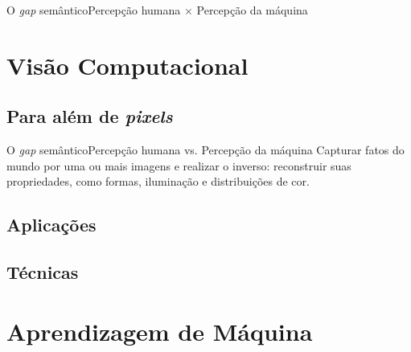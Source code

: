 \documentclass{beamer}
\begin{document}
    \begin{frame}{O \emph{gap} semântico}{Percepção humana $\times$ Percepção da máquina}
    
    \end{frame}

\section{Visão Computacional}

    \subsection{Para além de \emph{pixels}}

    \begin{frame}{O \emph{gap} semântico}{Percepção humana vs. Percepção da máquina}
        Capturar fatos do mundo por uma ou mais imagens e realizar o inverso: reconstruir suas propriedades, 
        como formas, iluminação e distribuições de cor.
    \end{frame}

    \subsection{Aplicações}

    \subsection{Técnicas}

\section{Aprendizagem de Máquina}
\end{document}
